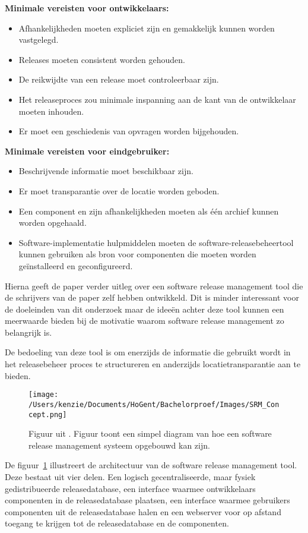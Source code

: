 \textbf{Minimale vereisten voor ontwikkelaars:}
\begin{itemize}
    \item Afhankelijkheden moeten expliciet zijn en gemakkelijk kunnen worden vastgelegd.
    \item Releases moeten consistent worden gehouden.
    \item De reikwijdte van een release moet controleerbaar zijn.
    \item Het releaseproces zou minimale inspanning aan de kant van de ontwikkelaar moeten inhouden.
    \item Er moet een geschiedenis van opvragen worden bijgehouden.
\end{itemize}
\textbf{Minimale vereisten voor eindgebruiker:}
\begin{itemize}
    \item Beschrijvende informatie moet beschikbaar zijn.
    \item Er moet transparantie over de locatie worden geboden.
    \item Een component en zijn afhankelijkheden moeten als één archief kunnen worden opgehaald.
    \item Software-implementatie hulpmiddelen moeten de software-releasebeheertool kunnen gebruiken als bron voor componenten die moeten worden geïnstalleerd en geconfigureerd.
\end{itemize}
Hierna geeft de paper \autocite{Hoek2002} verder uitleg over een software release management tool die de schrijvers van de paper zelf hebben ontwikkeld. Dit is minder interessant voor de doeleinden van dit onderzoek maar de ideeën achter deze tool kunnen een meerwaarde bieden bij de motivatie waarom software release management zo belangrijk is. 

De bedoeling van deze tool is om enerzijds de informatie die gebruikt wordt in het releasebeheer proces te structureren en anderzijds locatietransparantie aan te bieden.
\begin{figure}[!htbp]
    \centering
    \texttt{[image: /Users/kenzie/Documents/HoGent/Bachelorproef/Images/SRM\_Concept.png]}
    \caption{Figuur uit \autocite{Hoek2002}. Figuur toont een simpel diagram van hoe een software release management systeem opgebouwd kan zijn.}
    \label{fig:SRM_arch}
\end{figure}
De figuur~\ref{fig:SRM_arch} illustreert de architectuur van de software release management tool. Deze bestaat uit vier delen. Een logisch gecentraliseerde, maar fysiek gedistribueerde releasedatabase, een interface waarmee ontwikkelaars componenten in de releasedatabase plaatsen, een interface waarmee gebruikers componenten uit de releasedatabase halen en een webserver voor op afstand toegang te krijgen tot de releasedatabase en de componenten.

